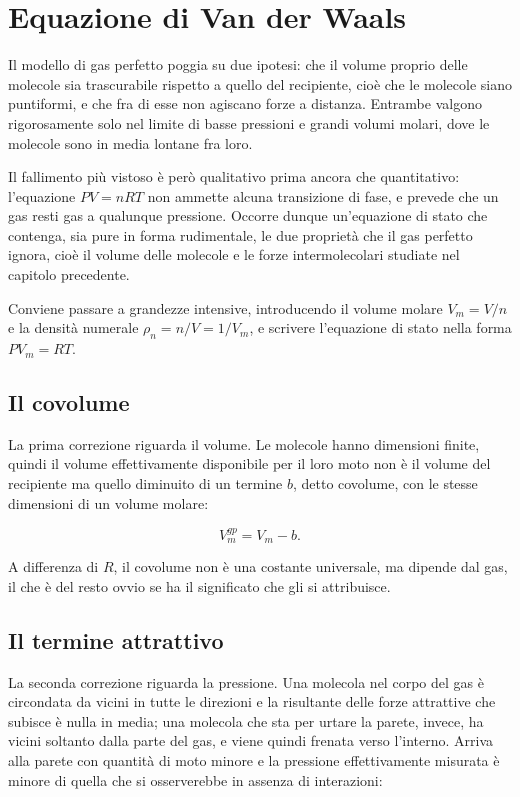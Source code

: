 \newpage

\section{Equazione di Van der Waals}

Il modello di gas perfetto poggia su due ipotesi: che il volume proprio delle molecole sia trascurabile rispetto a quello del recipiente, cioè che le molecole siano puntiformi, e che fra di esse non agiscano forze a distanza.
Entrambe valgono rigorosamente solo nel limite di basse pressioni e grandi volumi molari, dove le molecole sono in media lontane fra loro.

Il fallimento più vistoso è però qualitativo prima ancora che quantitativo: l'equazione $PV = nRT$ non ammette alcuna transizione di fase, e prevede che un gas resti gas a qualunque pressione.
Occorre dunque un'equazione di stato che contenga, sia pure in forma rudimentale, le due proprietà che il gas perfetto ignora, cioè il volume delle molecole e le forze intermolecolari studiate nel capitolo precedente.

Conviene passare a grandezze intensive, introducendo il volume molare $V_m = V/n$ e la densità numerale $\rho_n = n/V = 1/V_m$, e scrivere l'equazione di stato nella forma $PV_m = RT$.

\subsection{Il covolume}

La prima correzione riguarda il volume.
Le molecole hanno dimensioni finite, quindi il volume effettivamente disponibile per il loro moto non è il volume del recipiente ma quello diminuito di un termine $b$, detto covolume, con le stesse dimensioni di un volume molare:

\begin{equation}
    V_m^{gp} = V_m - b .
    \label{eq:covolume}
\end{equation}

A differenza di $R$, il covolume non è una costante universale, ma dipende dal gas, il che è del resto ovvio se ha il significato che gli si attribuisce.

\subsection{Il termine attrattivo}

La seconda correzione riguarda la pressione.
Una molecola nel corpo del gas è circondata da vicini in tutte le direzioni e la risultante delle forze attrattive che subisce è nulla in media; una molecola che sta per urtare la parete, invece, ha vicini soltanto dalla parte del gas, e viene quindi frenata verso l'interno.
Arriva alla parete con quantità di moto minore e la pressione effettivamente misurata è minore di quella che si osserverebbe in assenza di interazioni:

